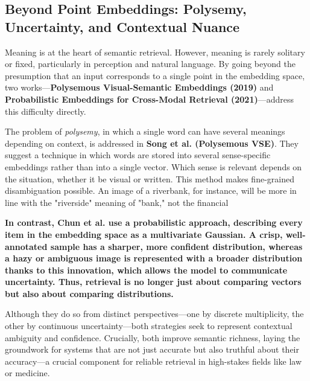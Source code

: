 \documentclass[conference]{IEEEtran}
\begin{document}
\subsection{Beyond Point Embeddings: Polysemy, Uncertainty, and Contextual Nuance}

Meaning is at the heart of semantic retrieval. However, meaning is rarely solitary or fixed, particularly in perception and natural language. By going beyond the presumption that an input corresponds to a single point in the embedding space, two works—\textbf{Polysemous Visual-Semantic Embeddings (2019)} and \textbf{Probabilistic Embeddings for Cross-Modal Retrieval (2021)}—address this difficulty directly.

The problem of \textit{polysemy}, in which a single word can have several meanings depending on context, is addressed in \textbf{Song et al. (Polysemous VSE)}. They suggest a technique in which words are stored into several sense-specific embeddings rather than into a single vector. Which sense is relevant depends on the situation, whether it be visual or written. This method makes fine-grained disambiguation possible. An image of a riverbank, for instance, will be more in line with the "riverside" meaning of "bank," not the financial

\textbf{In contrast, Chun et al. use a probabilistic approach, describing every item in the embedding space as a multivariate Gaussian. A crisp, well-annotated sample has a sharper, more confident distribution, whereas a hazy or ambiguous image is represented with a broader distribution thanks to this innovation, which allows the model to communicate uncertainty. Thus, retrieval is no longer just about comparing vectors but also about comparing distributions.}

Although they do so from distinct perspectives—one by discrete multiplicity, the other by continuous uncertainty—both strategies seek to represent contextual ambiguity and confidence. Crucially, both improve semantic richness, laying the groundwork for systems that are not just accurate but also truthful about their accuracy—a crucial component for reliable retrieval in high-stakes fields like law or medicine.
\end{document}
